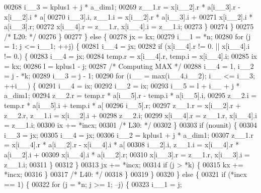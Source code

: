 \begin{DoxyCode}
00268                 i\_\_3 = kplus1 + j * a\_dim1;
00269                 z\_\_1.r = x[i\_\_2].r * a[i\_\_3].r - x[i\_\_2].i * a[
00270                     i\_\_3].i, z\_\_1.i = x[i\_\_2].r * a[i\_\_3].i + 
00271                     x[i\_\_2].i * a[i\_\_3].r;
00272                 x[i\_\_4].r = z\_\_1.r, x[i\_\_4].i = z\_\_1.i;
00273             \}
00274             \}
00275 \textcolor{comment}{/* L20: */}
00276         \}
00277         \} \textcolor{keywordflow}{else} \{
00278         jx = kx;
00279         i\_\_1 = *n;
00280         \textcolor{keywordflow}{for} (j = 1; j <= i\_\_1; ++j) \{
00281             i\_\_4 = jx;
00282             \textcolor{keywordflow}{if} (x[i\_\_4].r != 0. || x[i\_\_4].i != 0.) \{
00283             i\_\_4 = jx;
00284             temp.r = x[i\_\_4].r, temp.i = x[i\_\_4].i;
00285             ix = kx;
00286             l = kplus1 - j;
00287 \textcolor{comment}{/* Computing MAX */}
00288             i\_\_4 = 1, i\_\_2 = j - *k;
00289             i\_\_3 = j - 1;
00290             \textcolor{keywordflow}{for} (i\_\_ = max(i\_\_4,i\_\_2); i\_\_ <= i\_\_3; ++i\_\_) \{
00291                 i\_\_4 = ix;
00292                 i\_\_2 = ix;
00293                 i\_\_5 = l + i\_\_ + j * a\_dim1;
00294                 z\_\_2.r = temp.r * a[i\_\_5].r - temp.i * a[i\_\_5].i, 
00295                     z\_\_2.i = temp.r * a[i\_\_5].i + temp.i * a[
00296                     i\_\_5].r;
00297                 z\_\_1.r = x[i\_\_2].r + z\_\_2.r, z\_\_1.i = x[i\_\_2].i + 
00298                     z\_\_2.i;
00299                 x[i\_\_4].r = z\_\_1.r, x[i\_\_4].i = z\_\_1.i;
00300                 ix += *incx;
00301 \textcolor{comment}{/* L30: */}
00302             \}
00303             \textcolor{keywordflow}{if} (nounit) \{
00304                 i\_\_3 = jx;
00305                 i\_\_4 = jx;
00306                 i\_\_2 = kplus1 + j * a\_dim1;
00307                 z\_\_1.r = x[i\_\_4].r * a[i\_\_2].r - x[i\_\_4].i * a[
00308                     i\_\_2].i, z\_\_1.i = x[i\_\_4].r * a[i\_\_2].i + 
00309                     x[i\_\_4].i * a[i\_\_2].r;
00310                 x[i\_\_3].r = z\_\_1.r, x[i\_\_3].i = z\_\_1.i;
00311             \}
00312             \}
00313             jx += *incx;
00314             \textcolor{keywordflow}{if} (j > *k) \{
00315             kx += *incx;
00316             \}
00317 \textcolor{comment}{/* L40: */}
00318         \}
00319         \}
00320     \} \textcolor{keywordflow}{else} \{
00321         \textcolor{keywordflow}{if} (*incx == 1) \{
00322         \textcolor{keywordflow}{for} (j = *n; j >= 1; --j) \{
00323             i\_\_1 = j;

\end{DoxyCode}
